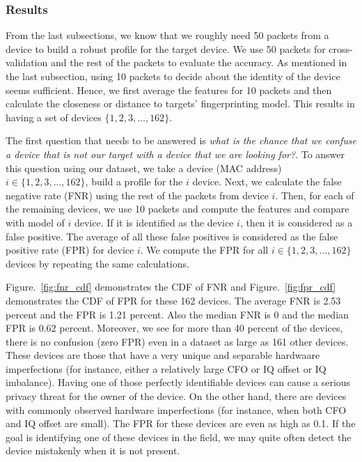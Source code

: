 \subsubsection*{Results}

From the last subsections, we know that we roughly need 50 packets from a device to build a robust profile for the target device. We use 50 packets for cross-validation and the rest of the packets to evaluate the accuracy. As mentioned in the last subsection, using 10 packets to decide about the identity of the device seems sufficient. Hence, we first average the features for 10 packets and then calculate the closeness or distance to targets' fingerprinting model. This results in having a set of devices $\{1,2,3,...,162\}$. 

The first question that needs to be answered is \textit{what is the chance that we confuse a device that is not our target with a device that we are looking for?}. To answer this question using our dataset, we take a device (MAC address) $i \in \{1,2,3,...,162\}$, build a profile for the $i$ device. Next, we calculate the false negative rate (FNR) using the rest of the packets from device $i$. Then, for each of the remaining devices, we use 10 packets and compute the features and compare with model of $i$ device. If it is identified as the device $i$, then it is considered as a false positive. The average of all these false positives is considered as the false positive rate (FPR) for device $i$. We compute the FPR for all $i \in \{1,2,3,...,162\}$ devices by repeating the same calculations.

Figure.~\ref{fig:fnr_cdf} demonstrates the CDF of FNR and Figure.~\ref{fig:fpr_cdf} demonstrates the CDF of FPR for these 162 devices. The average FNR is 2.53 percent and the FPR is 1.21 percent. Also the median FNR is 0 and the median FPR is 0.62 percent. Moreover, we see for more than 40 percent of the devices, there is no confusion (zero FPR) even in a dataset as large as 161 other devices. These devices are those that have a very unique and separable hardwaare imperfections (for instance, either a relatively large CFO or IQ offset or IQ imbalance). Having one of those perfectly identifiable devices can cause a serious privacy threat for the owner of the device. On the other hand, there are devices with commonly observed hardware imperfections (for instance, when both CFO and IQ offset are small). The FPR for these devices are even as high as 0.1. If the goal is identifying one of these devices in the field, we may quite often detect the device mistakenly when it is not present.


